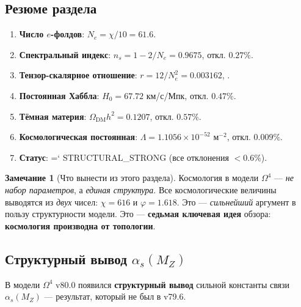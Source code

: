 \documentclass[11pt,a4paper]{article}
\newcommand{\Om}{\Omega^4}
\renewcommand{\texttt}[1]{{\ttfamily\hyphenchar\font=`\- #1}}
\theoremstyle{definition}
\newtheorem{remark}[theorem]{Замечание}
\begin{document}
\subsection{Резюме раздела}
\label{subsec:cosmology-summary}

\begin{enumerate}
    \item \textbf{Число $e$-фолдов}: $N_e = \chi/10 = 61.6$.
    \item \textbf{Спектральный индекс}: 
          $n_s = 1 - 2/N_e = 0.9675$, откл. $0.27\%$.
    \item \textbf{Тензор-скалярное отношение}: 
          $r = 12/N_e^2 = 0.003162$, \checkmark.
    \item \textbf{Постоянная Хаббла}: 
          $H_0 = 67.72$ км/с/Мпк, откл. $0.47\%$.
    \item \textbf{Тёмная материя}: 
          $\Omega_{\text{DM}} h^2 = 0.1207$, откл. $0.57\%$.
    \item \textbf{Космологическая постоянная}: 
          $\Lambda = 1.1056 \times 10^{-52}$ м$^{-2}$, 
          откл. $0.009\%$.
    \item \textbf{Статус}: \texttt{STRUCTURAL\_STRONG} 
          (все отклонения $< 0.6\%$).
\end{enumerate}

\begin{remark}[Что вынести из этого раздела]
\label{rem:cosmology-takeaway}
Космология в модели $\Om$ — \emph{не набор параметров}, 
а \emph{единая структура}. Все космологические величины 
выводятся из \emph{двух} чисел: $\chi = 616$ и 
$\varphi = 1.618$. Это — \emph{сильнейший} аргумент в пользу 
структурности модели. Это — \textbf{седьмая ключевая идея} 
обзора: \textbf{космология производна от топологии}.
\end{remark}
    
\subsection{Структурный вывод \texorpdfstring{$\alpha_s(M_Z)$}{alpha\_s(M\_Z)}}
\label{subsec:alphas-review}

В модели $\Om$ v80.0 появился \textbf{структурный вывод} 
сильной константы связи $\alpha_s(M_Z)$ — результат, который 
не был в v79.6.
\end{document}
